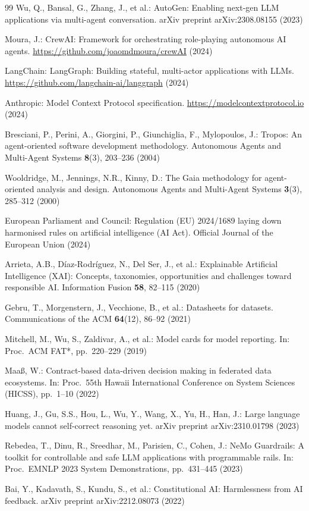 \documentclass[runningheads]{llncs}
\begin{document}
\begin{thebibliography}{99}
Wu, Q., Bansal, G., Zhang, J., et al.:
AutoGen: Enabling next-gen LLM applications via multi-agent conversation.
arXiv preprint arXiv:2308.08155 (2023)

Moura, J.:
CrewAI: Framework for orchestrating role-playing autonomous AI agents.
\url{https://github.com/joaomdmoura/crewAI} (2024)

LangChain:
LangGraph: Building stateful, multi-actor applications with LLMs.
\url{https://github.com/langchain-ai/langgraph} (2024)

Anthropic:
Model Context Protocol specification.
\url{https://modelcontextprotocol.io} (2024)

Bresciani, P., Perini, A., Giorgini, P., Giunchiglia, F., Mylopoulos, J.:
Tropos: An agent-oriented software development methodology.
Autonomous Agents and Multi-Agent Systems \textbf{8}(3), 203--236 (2004)

Wooldridge, M., Jennings, N.R., Kinny, D.:
The Gaia methodology for agent-oriented analysis and design.
Autonomous Agents and Multi-Agent Systems \textbf{3}(3), 285--312 (2000)

European Parliament and Council:
Regulation (EU) 2024/1689 laying down harmonised rules on artificial
intelligence (AI Act).
Official Journal of the European Union (2024)

Arrieta, A.B., D{\'i}az-Rodr{\'i}guez, N., Del Ser, J., et al.:
Explainable Artificial Intelligence (XAI): Concepts, taxonomies,
opportunities and challenges toward responsible AI.
Information Fusion \textbf{58}, 82--115 (2020)

Gebru, T., Morgenstern, J., Vecchione, B., et al.:
Datasheets for datasets.
Communications of the ACM \textbf{64}(12), 86--92 (2021)

Mitchell, M., Wu, S., Zaldivar, A., et al.:
Model cards for model reporting.
In: Proc.\ ACM FAT*, pp.~220--229 (2019)

Maa\ss{}, W.:
Contract-based data-driven decision making in federated data ecosystems.
In: Proc.\ 55th Hawaii International Conference on System Sciences
(HICSS), pp.~1--10 (2022)

Huang, J., Gu, S.S., Hou, L., Wu, Y., Wang, X., Yu, H., Han, J.:
Large language models cannot self-correct reasoning yet.
arXiv preprint arXiv:2310.01798 (2023)

Rebedea, T., Dinu, R., Sreedhar, M., Parisien, C., Cohen, J.:
NeMo Guardrails: A toolkit for controllable and safe LLM applications
with programmable rails.
In: Proc.\ EMNLP 2023 System Demonstrations, pp.~431--445 (2023)

Bai, Y., Kadavath, S., Kundu, S., et al.:
Constitutional AI: Harmlessness from AI feedback.
arXiv preprint arXiv:2212.08073 (2022)

\end{thebibliography}
\end{document}
